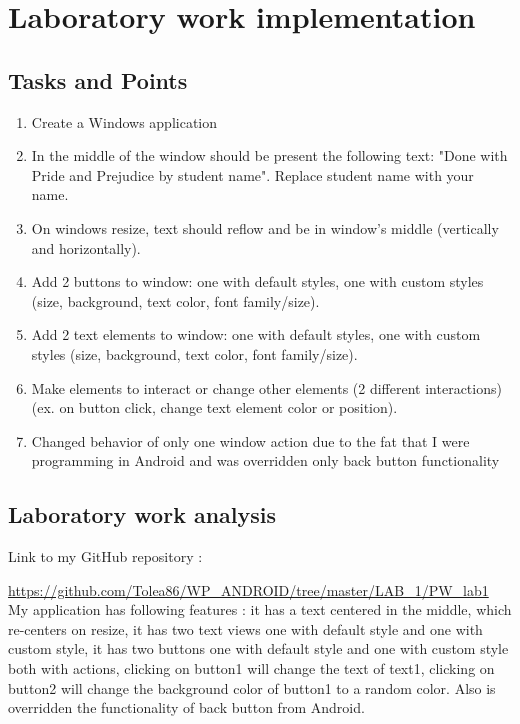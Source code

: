 \section{Laboratory work implementation}

\subsection{Tasks and Points}

\begin{enumerate}

\item Create a Windows application
\item In the middle of the window should be present the following text: "Done with Pride and Prejudice by student name". Replace student name with your name.
\item On windows resize, text should reflow and be in window's middle (vertically and horizontally).
\item Add 2 buttons to window: one with default styles, one with custom styles (size, background, text color, font family/size).
\item Add 2 text elements to window: one with default styles, one with custom styles (size, background, text color, font family/size).
\item Make elements to interact or change other elements (2 different interactions)  (ex. on button click, change text element color or position).
\item Changed behavior of only one window action due to the fat that I were programming in Android and was overridden only back button functionality

\end{enumerate}
\subsection{Laboratory work analysis}

Link to my GitHub repository : 

\url{https://github.com/Tolea86/WP_ANDROID/tree/master/LAB_1/PW_lab1}\\

My application has following features : it has a text centered in the middle, which re-centers on resize, it has two text views one with default style and one with custom style, it has two buttons one with default style and one with custom style both with actions, clicking on button1 will change the text of text1, clicking on button2 will change the background color of button1 to a random color. Also is overridden the functionality of back button from Android. 

